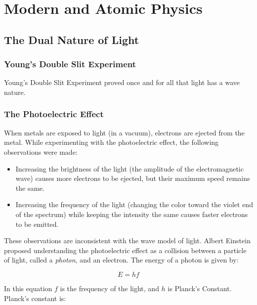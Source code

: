 \chapter{Modern and Atomic Physics}
\label{chap:modern}
\section{The Dual Nature of Light} 
\subsection{Young's Double Slit Experiment} 
Young's Double Slit Experiment proved once and for all that light has a wave nature.  
\subsection{The Photoelectric Effect} 

When metals are exposed to light (in a vacuum), electrons are ejected from the metal.  While experimenting with the photoelectric effect, the following observations were made:
\begin{itemize}
	\item Increasing the brightness of the light (the amplitude of the electromagnetic wave) causes more electrons to be ejected, but their maximum speed remains the same.
	\item Increasing the frequency of the light (changing the color toward the violet end of the spectrum) while keeping the intensity the same causes faster electrons to be emitted.
\end{itemize}

These observations are inconsistent with the wave model of light.  Albert Einstein proposed understanding the photoelectric effect as a collision between a particle of light, called a \textit{photon}, and an electron.  The energy of a photon is given by:

	\begin{mdframed}[backgroundcolor=orange!20!white]
	\begin{equation}
		E = h f
		\label{eqn:photonenergy}
	\end{equation}
\end{mdframed}

In this equation $f$ is the frequency of the light, and $h$ is Planck's Constant.  Planck's constant is: 

